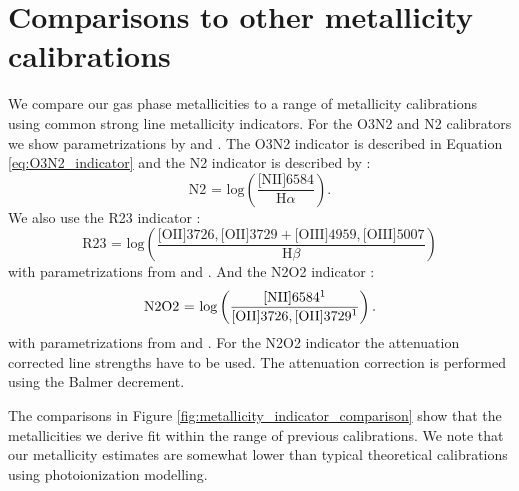\documentclass[fleqn,usenatbib]{mnras}
\begin{document}


\appendix

\section{Comparisons to other metallicity calibrations}
\label{sec:appendix_metallicities}

We compare our gas phase metallicities to a range of metallicity calibrations using common strong line metallicity indicators. For the O3N2 and N2 calibrators we show parametrizations by \cite{pettini2004, nagao2006, maiolino2008, marino2013, brown2016} and \cite{curti2017}. The O3N2 indicator is described in Equation \ref{eq:O3N2_indicator} and the N2 indicator is described by \citep{storchi-bergmann1994}:
\begin{equation}
    \textrm{N2 = log}\left(\frac{\textrm{[NII]}6584}{\textrm{H}\alpha}\right).
\end{equation}
We also use the R23 indicator \citep{pagel1979}:
\begin{equation}
    \textrm{R23 = log}\left(\frac{\textrm{[OII]}3726, \textrm{[OII]}3729 + \textrm{[OIII]}4959, \textrm{[OIII]}5007}{\textrm{H}\beta}\right)
\end{equation}
with parametrizations from \cite{mcgaugh1991, zaritsky1994, nagao2006, maiolino2008} and \cite{curti2017}. And the N2O2 indicator \citep{alloin1979}:
\begin{equation}
    \textrm{N2O2 = log}\left(\frac{\textrm{[NII]}6584\textrm{\footnotemark[1]}}{\textrm{[OII]}3726, \textrm{[OII]}3729\textrm{\footnotemark[1]}}\right).
\end{equation}
with parametrizations from \cite{kewley2002, nagao2006} and \cite{brown2016}. For the N2O2 indicator the attenuation corrected line strengths have to be used. The attenuation correction is performed using the Balmer decrement. 

The comparisons in Figure \ref{fig:metallicity_indicator_comparison} show that the metallicities we derive fit within the range of previous calibrations. We note that our metallicity estimates are somewhat lower than typical theoretical calibrations using photoionization modelling.
\end{document}
